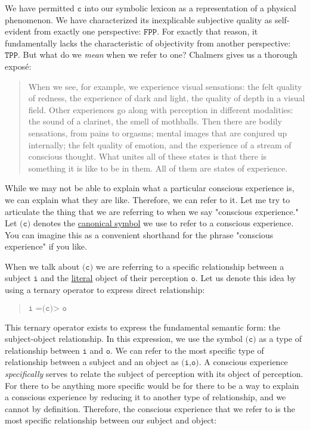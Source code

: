 \documentclass[runningheads]{llncs}
\newcommand{\lib}[2]{\href{https://dna-platform.github.io/inexplicable-phenomena#1}{#2}\xspace}
\begin{document}
We have permitted $\texttt{c}$ into our symbolic lexicon as a representation of a physical phenomenon. We have characterized its inexplicable subjective quality as self-evident from exactly one perspective: $\texttt{FPP}$. For exactly that reason, it fundamentally lacks the characteristic of objectivity from another perspective: $\texttt{TPP}$. But what do we \emph{mean} when we refer to one? Chalmers gives us a thorough exposé:

\begin{quote}
When we see, for example, we experience visual sensations: the felt quality of redness, the experience of dark and light, the quality of depth in a visual field. Other experiences go along with perception in different modalities: the sound of a clarinet, the smell of mothballs. Then there are bodily sensations, from pains to orgasms; mental images that are conjured up internally; the felt quality of emotion, and the experience of a stream of conscious thought. What unites all of these states is that there is something it is like to be in them. All of them are states of experience.
\end{quote}

While we may not be able to explain what a particular conscious experience is, we can explain what they are like. Therefore, we can refer to it. Let me try to articulate the thing that we are referring to when we say "conscious experience." Let $\texttt{(c)}$ denotes the \lib{/dictionary/canonical-symbol.html}{canonical symbol} we use to refer to a conscious experience. You can imagine this as a convenient shorthand for the phrase "conscious experience" if you like.

When we talk about $\texttt{(c)}$ we are referring to a specific relationship between a subject $\texttt{i}$ and the \lib{/dictionary/literal.html}{literal} object of their perception $\texttt{o}$. Let us denote this idea by using a ternary operator to express direct relationship:

\begin{quote}
$\texttt{i =(c)> o}$
\end{quote}

This ternary operator exists to express the fundamental semantic form: the subject-object relationship. In this expression, we use the symbol $\texttt{(c)}$ as a type of relationship between $\texttt{i}$ and $\texttt{o}$. We can refer to the most specific type of relationship between a subject and an object as $\texttt{(i,o)}$. A conscious experience \emph{specifically} serves to relate the subject of perception with its object of perception. For there to be anything more specific would be for there to be a way to explain a conscious experience by reducing it to another type of relationship, and we cannot by definition. Therefore, the conscious experience that we refer to is the most specific relationship between our subject and object:
\end{document}
